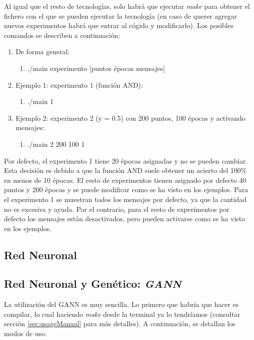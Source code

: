 Al igual que el resto de tecnologías, solo habrá que ejecutar \textit{make} para obtener el fichero con el que se pueden ejecutar la tecnología (en caso de querer agregar nuevos experimentos habrá que entrar al cógido y modificarlo). Los posibles comandos se describen a continuación:

\begin{enumerate}
    \item De forma general:
    \begin{enumerate}
        \item ./main experimento [puntos épocas mensajes]
    \end{enumerate}
    \item Ejemplo 1: experimento 1 (función AND):
    \begin{enumerate}
        \item ./main 1
    \end{enumerate}
    \item Ejemplo 2: experimento 2 (y = 0.5) con 200 puntos, 100 épocas y activando mensajes:
    \begin{enumerate}
        \item ./main 2 200 100 1
    \end{enumerate}
\end{enumerate}

Por defecto, el experimento 1 tiene 20 épocas asignadas y no se pueden cambiar. Esta decisión es debido a que la función AND suele obtener un acierto del 100\% en menos de 10 épocas. El resto de experimentos tienen asignado por defecto 40 puntos y 200 épocas y se puede modificar como se ha visto en los ejemplos. Para el experimento 1 se muestran todos los mensajes por defecto, ya que la cantidad no es excesiva y ayuda. Por el contrario, para el resto de experimentos por defecto los mensajes están desactivados, pero pueden activarse como se ha visto en los ejemplos.

\newpage
\subsection{Red Neuronal}


\newpage
\subsection{Red Neuronal y Genético: \textit{GANN}}

La utilización del GANN es muy sencilla. Lo primero que habría que hacer es compilar, lo cual haciendo \textit{make} desde la terminal ya lo tendríamos (consultar sección \ref{sec:usageManual} para más detalles). A continuación, se detallan los modos de uso.

